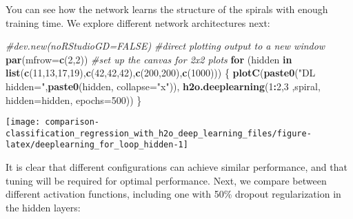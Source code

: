 \documentclass[]{book}
\newenvironment{Shaded}{\begin{snugshade}}{\end{snugshade}}
\newcommand{\CommentTok}[1]{\textcolor[rgb]{0.56,0.35,0.01}{\textit{#1}}}
\newcommand{\ControlFlowTok}[1]{\textcolor[rgb]{0.13,0.29,0.53}{\textbf{#1}}}
\newcommand{\DataTypeTok}[1]{\textcolor[rgb]{0.13,0.29,0.53}{#1}}
\newcommand{\DecValTok}[1]{\textcolor[rgb]{0.00,0.00,0.81}{#1}}
\newcommand{\KeywordTok}[1]{\textcolor[rgb]{0.13,0.29,0.53}{\textbf{#1}}}
\newcommand{\NormalTok}[1]{#1}
\newcommand{\OperatorTok}[1]{\textcolor[rgb]{0.81,0.36,0.00}{\textbf{#1}}}
\newcommand{\StringTok}[1]{\textcolor[rgb]{0.31,0.60,0.02}{#1}}
\begin{document}
You can see how the network learns the structure of the spirals with enough training time. We explore different network architectures next:

\begin{Shaded}
\begin{Highlighting}[]
\CommentTok{#dev.new(noRStudioGD=FALSE) #direct plotting output to a new window}
\KeywordTok{par}\NormalTok{(}\DataTypeTok{mfrow=}\KeywordTok{c}\NormalTok{(}\DecValTok{2}\NormalTok{,}\DecValTok{2}\NormalTok{)) }\CommentTok{#set up the canvas for 2x2 plots}
\ControlFlowTok{for}\NormalTok{ (hidden }\ControlFlowTok{in} \KeywordTok{list}\NormalTok{(}\KeywordTok{c}\NormalTok{(}\DecValTok{11}\NormalTok{,}\DecValTok{13}\NormalTok{,}\DecValTok{17}\NormalTok{,}\DecValTok{19}\NormalTok{),}\KeywordTok{c}\NormalTok{(}\DecValTok{42}\NormalTok{,}\DecValTok{42}\NormalTok{,}\DecValTok{42}\NormalTok{),}\KeywordTok{c}\NormalTok{(}\DecValTok{200}\NormalTok{,}\DecValTok{200}\NormalTok{),}\KeywordTok{c}\NormalTok{(}\DecValTok{1000}\NormalTok{))) \{}
  \KeywordTok{plotC}\NormalTok{(}\KeywordTok{paste0}\NormalTok{(}\StringTok{"DL hidden="}\NormalTok{,}\KeywordTok{paste0}\NormalTok{(hidden, }\DataTypeTok{collapse=}\StringTok{"x"}\NormalTok{)),}
        \KeywordTok{h2o.deeplearning}\NormalTok{(}\DecValTok{1}\OperatorTok{:}\DecValTok{2}\NormalTok{,}\DecValTok{3}\NormalTok{ ,spiral, }\DataTypeTok{hidden=}\NormalTok{hidden, }\DataTypeTok{epochs=}\DecValTok{500}\NormalTok{))}
\NormalTok{\}}
\end{Highlighting}
\end{Shaded}

\begin{center}\texttt{[image: comparison-classification\_regression\_with\_h2o\_deep\_learning\_files/figure-latex/deeplearning\_for\_loop\_hidden-1]} \end{center}

It is clear that different configurations can achieve similar performance, and that tuning will be required for optimal performance. Next, we compare between different activation functions, including one with 50\% dropout regularization in the hidden layers:
\end{document}
